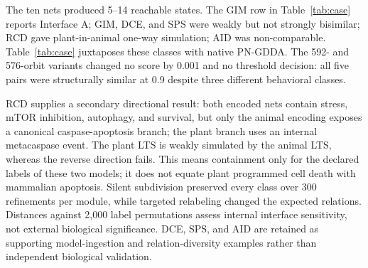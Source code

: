 \documentclass{ws-jbcb}
\numberwithin{equation}{section}
\begin{document}
The ten nets produced 5--14 reachable states. The GIM row in
Table~\ref{tab:case} reports Interface A; GIM, DCE, and SPS were weakly but
not strongly bisimilar; RCD gave plant-in-animal one-way simulation; AID was
non-comparable. Table~\ref{tab:case} juxtaposes these classes with native
PN-GDDA. The 592- and 576-orbit variants changed no score by 0.001 and no
threshold decision: all five pairs were structurally similar at 0.9 despite
three different behavioral classes.

\begin{table}[t]
\end{table}

RCD supplies a secondary directional result: both encoded nets contain stress,
mTOR inhibition, autophagy, and survival, but only the animal encoding exposes a
canonical caspase-apoptosis branch; the plant branch uses an internal metacaspase
event. The plant LTS is weakly simulated by the animal LTS, whereas the reverse
direction fails. This means containment only for the declared labels of these
two models; it does not equate plant programmed cell death with mammalian
apoptosis. Silent subdivision preserved every class over 300 refinements per
module, while targeted relabeling changed the expected relations. Distances
against 2,000 label permutations assess internal interface sensitivity, not
external biological significance. DCE, SPS, and AID are retained as supporting
model-ingestion and relation-diversity examples rather than independent
biological validation.
\end{document}
